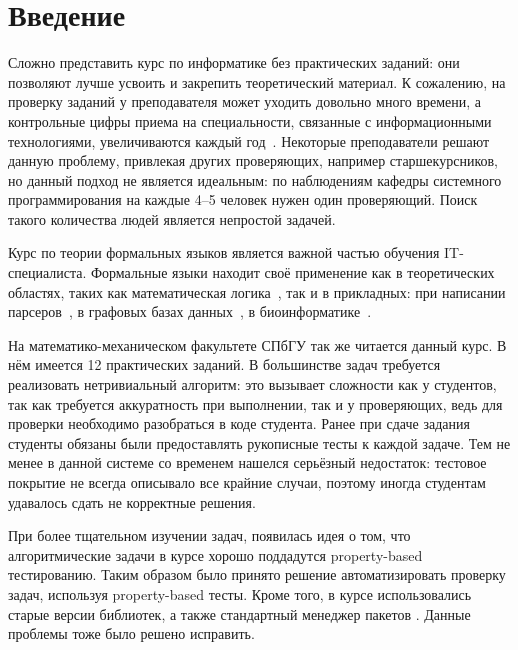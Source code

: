 
\section*{Введение}
\thispagestyle{withCompileDate}

Сложно представить курс по информатике без практических заданий: они позволяют лучше усвоить и закрепить теоретический материал.
К сожалению, на проверку заданий у преподавателя может уходить довольно много времени, а контрольные цифры приема на специальности, связанные с информационными технологиями, увеличиваются каждый год~\cite{2024GoduKolichestvo}.
Некоторые преподаватели решают данную проблему, привлекая других проверяющих, например старшекурсников, но данный подход не является идеальным: по наблюдениям кафедры системного программирования на каждые 4--5 человек нужен один проверяющий.
Поиск такого количества людей является непростой задачей.

Курс по теории формальных языков является важной частью обучения IT-специалиста.
Формальные языки находит своё применение как в теоретических областях, таких как математическая логика~\cite{guhaParikhAutomataInfinite2022,draghiciSemEnovArithmetic2023a}, так и в прикладных: при написании парсеров~\cite{gruneParsingTechniques2008, scottGLLParsing2010}, в графовых базах данных~\cite{hellingsQueryingPathsGraphs2016,noleRegularPathQueries2016}, в биоинформатике~\cite{dyrkaEstimatingProbabilisticContextfree2019,wjandersonEvolvingStochasticContext2012}.

На математико-механическом факультете СПбГУ так же читается данный курс.
В нём имеется 12 практических заданий.
В большинстве задач требуется реализовать нетривиальный алгоритм: это вызывает сложности как у студентов, так как требуется аккуратность при выполнении, так и у проверяющих, ведь для проверки необходимо разобраться в коде студента.
Ранее при сдаче задания студенты обязаны были предоставлять рукописные тесты к каждой задаче.
Тем не менее в данной системе со временем нашелся серьёзный недостаток: тестовое покрытие не всегда описывало все крайние случаи, поэтому иногда студентам удавалось сдать не корректные решения.

При более тщательном изучении задач, появилась идея о том, что алгоритмические задачи в курсе хорошо поддадутся property-based тестированию.
Таким образом было принято решение автоматизировать проверку задач, используя property-based тесты.
Кроме того, в курсе использовались старые версии библиотек, а также стандартный менеджер пакетов \python{}.
Данные проблемы тоже было решено исправить.
